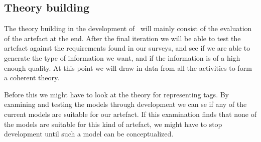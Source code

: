 \subsection{Theory building}
The theory building in the development of \theartefact\ will mainly consist of the evaluation of the artefact at the end.
After the final iteration we will be able to test the artefact against the requirements found in our surveys, 
and see if we are able to generate the type of information we want, and if the information is of a high enough quality.
At this point we will draw in data from all the activities to form a coherent theory.

Before this we might have to look at the theory for representing tags.
By examining and testing the models through development we can se if any of the current models are suitable for our artefact.
If this examination finds that none of the models are suitable for this kind of artefact, we might have to stop development
until such a model can be conceptualized.







